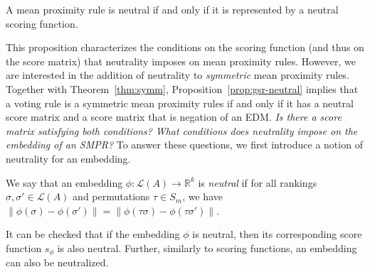 \documentclass[prodmode,acmec]{ec-acmsmall}
\newcommand{\calL}{{\mathcal{L}}}
\newcommand{\rank}{{\calL(A)}}
\begin{document}
\begin{proposition}
A mean proximity rule is neutral if and only if it is represented by a neutral scoring function.
\label{prop:gsr-neutral}
\end{proposition}
%
This proposition characterizes the conditions on the scoring function (and thus on the score matrix) that neutrality imposes on mean proximity rules. However, we are interested in the addition of neutrality to \emph{symmetric} mean proximity rules. Together with Theorem~\ref{thm:symm}, Proposition~\ref{prop:gsr-neutral} implies that a voting rule is a symmetric mean proximity rules if and only if it has a neutral score matrix and a score matrix that is negation of an EDM. \emph{Is there a score matrix satisfying both conditions?} \emph{What conditions does neutrality impose on the embedding of an SMPR?} To answer these questions, we first introduce a notion of neutrality for an embedding.



\begin{definition}
We say that an embedding $\phi:\rank \rightarrow \mathbb{R}^k$ is \emph{neutral} if for all rankings $\sigma,\sigma' \in \rank$ and permutations $\tau \in S_m$, we have $\|\phi(\sigma)-\phi(\sigma')\| = \|\phi(\tau \sigma)-\phi(\tau\sigma')\|$.
\end{definition}
%
It can be checked that if the embedding $\phi$ is neutral, then its corresponding score function $s_{\phi}$ is also neutral. Further, similarly to scoring functions, an embedding can also be neutralized. 
\end{document}

